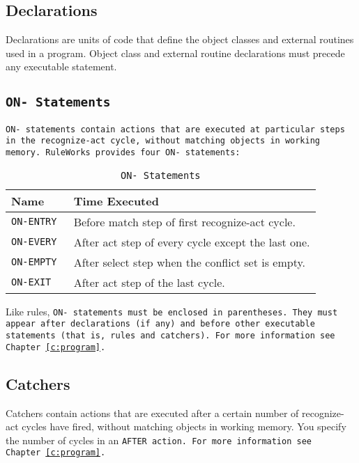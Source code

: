 \subsection{Declarations}

Declarations are units of code that define the object classes and
external routines used in a program. Object class and external routine
declarations must precede any executable statement.

\subsection{\tt{ON-} Statements}

\tt{ON-} statements contain actions that are executed at particular
steps in the recognize-act cycle, without matching objects in working
memory. RuleWorks provides four \tt{ON-} statements:

\begin{table}[h]
  \begin{tabularx}{\columnwidth}{lX}
    \toprule
    Name     & Time Executed               \\
    \midrule
    \tt{ON-ENTRY} & Before match step of first recognize-act cycle. \\
    \tt{ON-EVERY} & After act step of every cycle except the last one. \\
    \tt{ON-EMPTY} & After select step when the conflict set is empty. \\
    \tt{ON-EXIT}  & After act step of the last cycle.  \\
    \bottomrule
  \end{tabularx}
  \caption{\tt{ON-} Statements}
  \label{t:ons}
\end{table}

Like rules, \tt{ON-} statements must be enclosed in parentheses. They
must appear after declarations (if any) and before other executable
statements (that is, rules and catchers). For more information see
Chapter~\ref{c:program}.

\subsection{Catchers}

Catchers contain actions that are executed after a certain number of
recognize-act cycles have fired, without matching objects in working
memory. You specify the number of cycles in an \tt{AFTER} action. For
more information see Chapter~\ref{c:program}.

